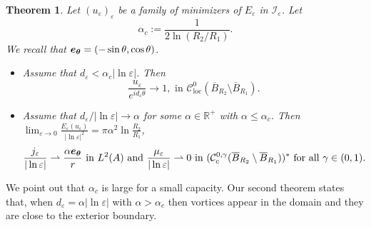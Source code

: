 \documentclass[12pt,reqno]{amsart}
\newtheorem{theorem}{Theorem}[section]
\def\C{{\mathcal C}}
\def\I{{\mathcal I}}
\def\e {{\varepsilon}}
\renewcommand{\vec}[1]{\text{\boldmath $#1$}}
\newcommand{\R}{\mathbb{R}}
\numberwithin{equation}{section}
\begin{document}
 \begin{theorem}\label{th:uniqueness_d_small}
 Let \( (u_\e)_\e\) be a family of minimizers of \(E_\e\) in \({\I}_\e\). Let 
 \begin{equation}\label{eq:critical_alpha}
 \alpha_c:=\frac{1}{2\ln \left(R_2/R_1 \right)}.
 \end{equation}
  We recall that  \(\vec{e_\theta}=(-\sin \theta,\cos \theta)\).
  \begin{itemize}
  \item[1)]Assume that \(d_\e< \alpha_c |\ln \e|\). Then 
 \begin{equation}
 \frac{u_\e}{e^{id_\e\theta}} \rightarrow 1, \text{ in } \C^0_{\text{loc}}(\overline{B}_{R_2}\setminus \overline{B}_{R_1}).
 \end{equation}
 
 \item[2)] Assume that \(d_\e/|\ln \e| \to \alpha \) for some \(\alpha \in \R^+\) with \(\alpha\leq \alpha_c\). Then \(\lim_{\e\to 0} \frac{E_\e(u_\e)}{|\ln \e|^2}=\pi \alpha^2 \ln \frac{R_2}{R_1}\),
\begin{equation*}
\frac{j_\e}{|\ln \e|}\rightharpoonup \frac{\alpha \vec{e_\theta}}{r} \text{ in } L^2(A)  \text{ and }  \frac{\mu_\e}{|\ln \e|} \rightharpoonup 0 \text{ in } (\C^{0,\gamma}_c(\overline{B}_{R_2}\setminus \overline{B}_{R_1}))^* \text{ for all } \gamma \in (0,1).
\end{equation*}

  \end{itemize}
 
  \end{theorem}
 
 
 We point out that $\alpha_c$ is large for a small capacity. 
 Our second theorem states that, when \(d_\e=\alpha|\ln \e|\) with \(\alpha>\alpha_c\) then vortices appear in the domain and they are close to the exterior boundary. 
\end{document}
